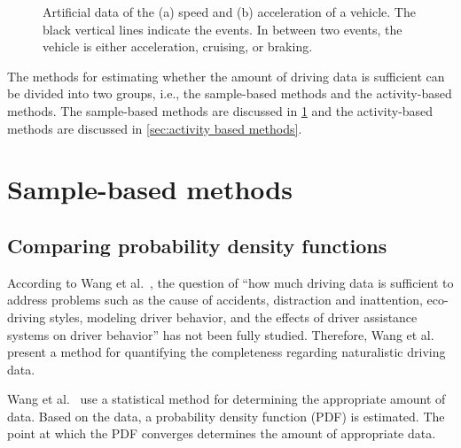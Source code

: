 \documentclass[10pt,final,a4paper,oneside,onecolumn]{article}
\newlength\figurewidth
\newlength\figureheight
\newcommand*{\etal}{et al.}                                     %
\theoremstyle{plain}\newtheorem{definition}{Definition}[section]    %
\theoremstyle{definition}\newtheorem{example}{Example}[section]     %
\theoremstyle{remark}\newtheorem{remarkenv}{Remark}[section]        %
\begin{document}
\setlength{}              %
\setlength{}              %
\begin{figure}
	\centering
	\begin{minipage}{\linewidth}
		\centering
	\end{minipage}
	\begin{minipage}{\linewidth}
		\centering
	\end{minipage}
	\caption{Artificial data of the (a) speed and (b) acceleration of a vehicle. The black vertical lines indicate the events. In between two events, the vehicle is either acceleration, cruising, or braking.}
	\label{fig:artificial data}	
\end{figure}

The methods for estimating whether the amount of driving data is sufficient can be divided into two groups, i.e., the sample-based methods and the activity-based methods. The sample-based methods are discussed in \cref{sec:sample based} and the activity-based methods are discussed in \cref{sec:activity based methods}.


\section{Sample-based methods}
\label{sec:sample based}


\subsection{Comparing probability density functions}
\label{sec:sample based pdf}

According to Wang \etal\ \cite{wang2017much}, the question of ``how much driving data is sufficient to address problems such as the cause of accidents, distraction and inattention, eco-driving styles, modeling driver behavior, and the effects of driver assistance systems on driver behavior'' has not been fully studied. Therefore, Wang \etal\ \cite{wang2017much} present a method for quantifying the completeness regarding naturalistic driving data. 

Wang \etal\ \cite{wang2017much} use a statistical method for determining the appropriate amount of data. Based on the data, a probability density function (PDF) is estimated. The point at which the PDF converges determines the amount of appropriate data. 
\end{document}
